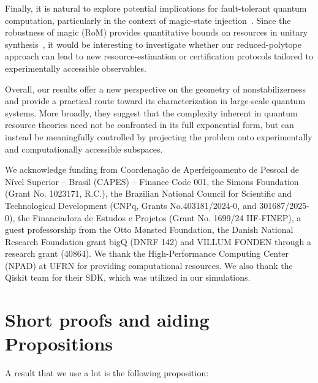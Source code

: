 \documentclass[10pt,aps,pra,twocolumn,floatfix,nofootinbib,superscriptaddress,longbibliography]{revtex4-2}
\newcommand{\1}{\mathbbm{1}}
\begin{document}
Finally, it is natural to explore potential implications for fault-tolerant quantum computation, particularly in the context of magic-state injection~\cite{bravyi2005universal}. Since the robustness of magic (RoM) provides quantitative bounds on resources in unitary synthesis~\cite{howard2017application}, it would be interesting to investigate whether our reduced-polytope approach can lead to new resource-estimation or certification protocols tailored to experimentally accessible observables.

Overall, our results offer a new perspective on the geometry of nonstabilizerness and provide a practical route toward its characterization in large-scale quantum systems. More broadly, they suggest that the complexity inherent in quantum resource theories need not be confronted in its full exponential form, but can instead be meaningfully controlled by projecting the problem onto experimentally and computationally accessible subspaces.


\begin{acknowledgments}
We acknowledge funding from Coordenação de Aperfeiçoamento de Pessoal de Nível Superior – Brasil (CAPES) – Finance Code 001, the Simons Foundation (Grant No. 1023171, R.C.), the Brazilian National Council for Scientific and Technological Development (CNPq, Grants No.403181/2024-0, and 301687/2025-0), the Financiadora de Estudos e Projetos (Grant No. 1699/24 IIF-FINEP),  a guest professorship from the Otto M\o nsted Foundation,  the Danish National Research Foundation grant bigQ (DNRF 142) and VILLUM FONDEN through a research grant (40864). We thank the High-Performance Computing Center (NPAD) at UFRN for providing computational resources. We also thank the Qiskit team for their SDK, which was utilized in our simulations.
\end{acknowledgments}




\appendix
\onecolumngrid


\section{Short proofs and aiding Propositions}

\noindent 
A result that we use a lot is the following proposition:
\end{document}
